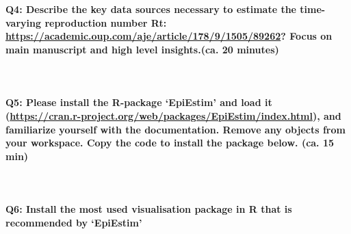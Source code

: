 \documentclass[
  11pt,
]{article}
\begin{document}
~

\hypertarget{q4-describe-the-key-data-sources-necessary-to-estimate-the-time-varying-reproduction-number-rt-httpsacademic.oup.comajearticle1789150589262-focus-on-main-manuscript-and-high-level-insights.ca.-20-minutes}{%
\paragraph{\texorpdfstring{Q4: Describe the key data sources necessary
to estimate the time-varying reproduction number Rt:
\url{https://academic.oup.com/aje/article/178/9/1505/89262}? Focus on
main manuscript and high level insights.(ca. 20
minutes)}{Q4: Describe the key data sources necessary to estimate the time-varying reproduction number Rt: https://academic.oup.com/aje/article/178/9/1505/89262? Focus on main manuscript and high level insights.(ca. 20 minutes)}}\label{q4-describe-the-key-data-sources-necessary-to-estimate-the-time-varying-reproduction-number-rt-httpsacademic.oup.comajearticle1789150589262-focus-on-main-manuscript-and-high-level-insights.ca.-20-minutes}}

~

\hypertarget{q5-please-install-the-r-package-epiestim-and-load-it-httpscran.r-project.orgwebpackagesepiestimindex.html-and-familiarize-yourself-with-the-documentation.-remove-any-objects-from-your-workspace.-copy-the-code-to-install-the-package-below.-ca.-15-min}{%
\paragraph{\texorpdfstring{Q5: Please install the R-package `EpiEstim'
and load it
(\url{https://cran.r-project.org/web/packages/EpiEstim/index.html}), and
familiarize yourself with the documentation. Remove any objects from
your workspace. Copy the code to install the package below. (ca. 15
min)}{Q5: Please install the R-package `EpiEstim' and load it (https://cran.r-project.org/web/packages/EpiEstim/index.html), and familiarize yourself with the documentation. Remove any objects from your workspace. Copy the code to install the package below. (ca. 15 min)}}\label{q5-please-install-the-r-package-epiestim-and-load-it-httpscran.r-project.orgwebpackagesepiestimindex.html-and-familiarize-yourself-with-the-documentation.-remove-any-objects-from-your-workspace.-copy-the-code-to-install-the-package-below.-ca.-15-min}}

~

\hypertarget{q6-install-the-most-used-visualisation-package-in-r-that-is-recommended-by-epiestim}{%
\paragraph{Q6: Install the most used visualisation package in R that is
recommended by
`EpiEstim'}\label{q6-install-the-most-used-visualisation-package-in-r-that-is-recommended-by-epiestim}}
\end{document}
